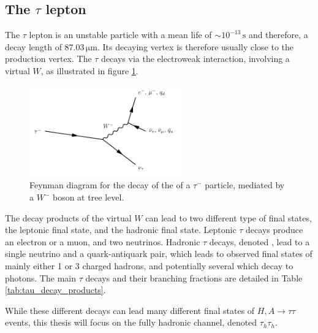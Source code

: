 \subsection{The $\tau$ lepton}
\label{sec:tau_lepton}
The $\tau$ lepton is an unstable particle with a mean life of $\sim 10^{-13}\,\mathrm{s}$ \cite{pdg2016} and therefore, a decay length of $87.03\, \mathrm{\mu m}$. Its decaying vertex is therefore usually close to the production vertex. The $\tau$ decays via the electroweak interaction, involving a virtual $W$, as illustrated in figure \ref{fig:tau_decay}.

\begin{figure}
    \centering
    \includegraphics[width=0.6\textwidth]{Images/taudecay.pdf}
    \caption{Feynman diagram for the decay of the of a $\tau^-$ particle, mediated by a $W^-$ boson at tree level.}
    \label{fig:tau_decay}
\end{figure}

The decay products of the virtual $W$ can lead to two different type of final states, the leptonic final state, and the hadronic final state. Leptonic $\tau$ decays produce an electron or a muon, and two neutrinos. Hadronic $\tau$ decays, denoted \tauh, lead to a single neutrino and a quark-antiquark pair, which leads to observed final states of mainly either 1 or 3 charged hadrons, and potentially several \pizero which decay to photons. The main $\tau$ decays and their branching fractions are detailed in Table \ref{tab:tau_decay_products}. 

While these different decays can lead many different final states of $H,A \rightarrow \tau\tau$ events, this thesis will focus on the fully hadronic channel, denoted $\tau_h \tau_h$.


